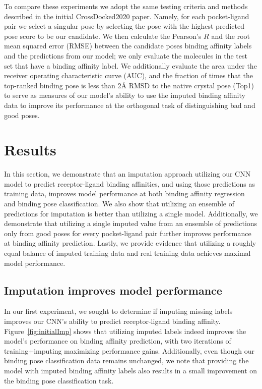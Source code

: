 \documentclass[journal=jcim,manuscript=article]{achemso}
\begin{document}
To compare these experiments we adopt the same testing criteria and methods described in the initial CrossDocked2020 paper\cite{crossdocked2020}.
Namely, for each pocket-ligand pair we select a singular pose by selecting the pose with the highest predicted pose score to be our candidate. 
We then calculate the Pearson's $R$ and the root mean squared error (RMSE) between the candidate poses binding affinity labels and the predictions from our model; we only evaluate the molecules in the test set that have a binding affinity label.
We additionally evaluate the area under the receiver operating characteristic curve (AUC), and the fraction of times that the top-ranked binding pose is less than 2{\AA} RMSD to the native crystal pose (Top1) to serve as measures of our model's ability to use the imputed binding affinity data to improve its performance at the orthogonal task of distinguishing bad and good poses.


\section{Results}
In this section, we demonstrate that an imputation approach utilizing our CNN model to predict receptor-ligand binding affinities, and using those predictions as training data, improves model performance at both binding affinity regression and binding pose classification.
We also show that utilizing an ensemble of predictions for imputation is better than utilizing a single model.
Additionally, we demonstrate that utilizing a single imputed value from an ensemble of predictions only from good poses for every pocket-ligand pair further improves performance at binding affinity prediction.
Lastly, we provide evidence that utilizing a roughly equal balance of imputed training data and real training data achieves maximal model performance.

\subsection{Imputation improves model performance}
In our first experiment, we sought to determine if imputing missing labels improves our CNN's ability to predict receptor-ligand binding affinity.
Figure~\ref{fig:initialImp} shows that utilizing imputed labels indeed improves the model's performance on binding affinity prediction, with two iterations of training+imputing maximizing performance gains.
Additionally, even though our binding pose classification data remains unchanged, we note that providing the model with imputed binding affinity labels also results in a small improvement on the binding pose classification task.
\end{document}
